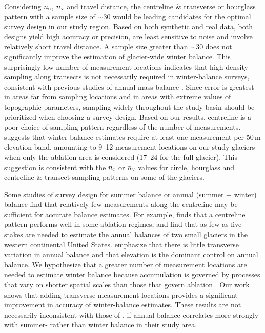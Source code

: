 \documentclass{article}
\begin{document}
Considering $n_{\rm c}$, $n_{\rm v}$ and travel distance, the centreline \& transverse or hourglass pattern with a sample size of $\sim30$ would be leading candidates for the optimal survey design in our study region. Based on both synthetic and real data, both designs yield high accuracy or precision, are least sensitive to noise and involve relatively short travel distance. A sample size greater than $\sim$30 does not significantly improve the estimation of glacier-wide winter balance. This surprisingly low number of measurement locations indicates that high-density sampling along transects is not necessarily required in winter-balance surveys, consistent with previous studies of annual mass balance \citep[e.g.][]{Cogley1999,Fountain1999}. Since error is greatest in areas far from sampling locations and in areas with extreme values of topographic parameters, sampling widely throughout the study basin should be prioritized when choosing a survey design.  Based on our results, centreline is a poor choice of sampling pattern regardless of the number of measurements. \cite{Walmsley2015} suggests that winter-balance estimates require at least one measurement per 50\,m elevation band, amounting to 9--12 measurement locations on our study glaciers when only the ablation area is considered (17--24 for the full glacier). This suggestion is consistent with the $n_{\rm c}$ or $n_{\rm v}$ values for circle, hourglass and centreline \& transect sampling patterns on some of the glaciers.

Some studies of survey design for summer balance or annual (summer + winter) balance find that relatively few measurements along the centreline may be sufficient for accurate balance estimates. For example, \cite{Surjanovic2016} finds that a centreline pattern performs well in some ablation regimes, and \cite{Fountain1999} find that as few as five stakes are needed to estimate the annual balances of two small glaciers in the western continental United States. \cite{Fountain1999} emphasize that there is little transverse variation in annual balance and that elevation is the dominant control on annual balance. We hypothesize that a greater number of measurement locations are needed to estimate winter balance because accumulation is governed by processes that vary on shorter spatial scales than those that govern ablation \citep[e.g.][]{Dadic2010,Clark2011}. 
Our work shows that adding transverse measurement locations provides a significant improvement in accuracy of winter-balance estimates.
These results are not necessarily inconsistent with those of \cite{Fountain1999}, if annual balance correlates more strongly with summer- rather than winter balance in their study area.
\end{document}
